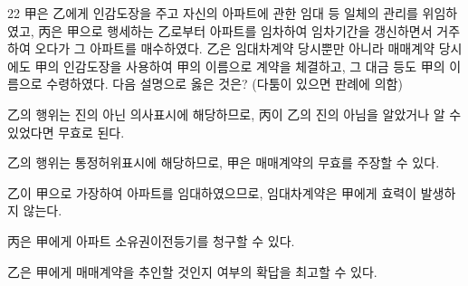 \begin{question}{22}
甲은 乙에게 인감도장을 주고 자신의 아파트에 관한 임대 등 일체의 관리를 위임하였고, 丙은 甲으로 행세하는 乙로부터 아파트를 임차하여 임차기간을 갱신하면서 거주하여 오다가 그 아파트를 매수하였다. 乙은 임대차계약 당시뿐만 아니라 매매계약 당시에도 甲의 인감도장을 사용하여 甲의 이름으로 계약을 체결하고, 그 대금 등도 甲의 이름으로 수령하였다. 다음 설명으로 옳은 것은? (다툼이 있으면 판례에 의함)
\begin{choices}
  \item 乙의 행위는 진의 아닌 의사표시에 해당하므로, 丙이 乙의 진의 아님을 알았거나 알 수 있었다면 무효로 된다.
  \item 乙의 행위는 통정허위표시에 해당하므로, 甲은 매매계약의 무효를 주장할 수 있다.
  \item 乙이 甲으로 가장하여 아파트를 임대하였으므로, 임대차계약은 甲에게 효력이 발생하지 않는다.
  \item 丙은 甲에게 아파트 소유권이전등기를 청구할 수 있다.
  \item 乙은 甲에게 매매계약을 추인할 것인지 여부의 확답을 최고할 수 있다.
\end{choices}
\end{question}
